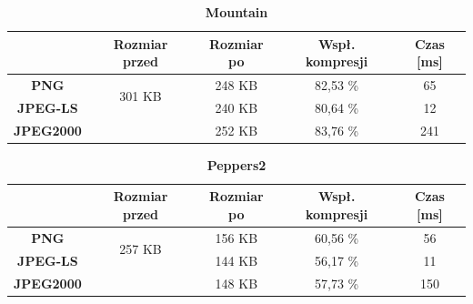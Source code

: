 \begin{table}[!h]
	\centering
	\caption{\textbf{Mountain}}
	\label{my-label}
	\begin{tabular}{|c|c|c|c|c|}                                             
		\hline
		& \textbf{Rozmiar przed} & \textbf{Rozmiar po} & \textbf{Wspł. kompresji} & \textbf{Czas {[}ms{]}} \\ \hline 
		\textbf{PNG}      &          \multicolumn{1}{c|}{\multirow{2}{*}{301 KB}}             &       248 KB              &      82,53 \%                   &            65                 \\\cline{3-5}
		\textbf{JPEG-LS}  &                        &       240 KB              &          80,64 \%               &            12              \\\cline{3-5}
		\textbf{JPEG2000} &                        &       252 KB              &          83,76 \%               &       241               \\ \hline
	\end{tabular}
\end{table}

\begin{table}[!h]
	\centering
	\caption{\textbf{Peppers2}}
	\label{my-label}
	\begin{tabular}{|c|c|c|c|c|}                                             
		\hline
		& \textbf{Rozmiar przed} & \textbf{Rozmiar po} & \textbf{Wspł. kompresji} & \textbf{Czas {[}ms{]}} \\ \hline 
		\textbf{PNG}      &          \multicolumn{1}{c|}{\multirow{2}{*}{257 KB}}             &      156 KB               &     60,56 \%                    &          56                   \\\cline{3-5}
		\textbf{JPEG-LS}  &                        &       144 KB              &       56,17 \%                  &             11             \\\cline{3-5}
		\textbf{JPEG2000} &                        &       148 KB              &       57,73 \%                  &        150              \\ \hline
	\end{tabular}
\end{table}

